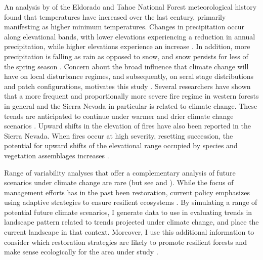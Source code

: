 An analysis by \citep{Mallek2014} of the Eldorado and Tahoe National Forest meteorological history found that temperatures have increased over the last century, primarily manifesting as higher minimum temperatures. Changes in precipitation occur along elevational bands, with lower elevations experiencing a reduction in annual precipitation, while higher elevations experience an increase \citep{Mallek2014}. In addition, more precipitation is falling as rain as opposed to snow, and snow persists for less of the spring season \citep{Mallek2014}. Concern about the broad influence that climate change will have on local disturbance regimes, and subsequently, on seral stage distributions and patch configurations, motivates this study \citep{Fule2008,North2012}. Several researchers have shown that a more frequent and proportionally more severe fire regime in western forests in general and the Sierra Nevada in particular \citep{McKenzie2004,Westerling2011,Miller2012} is related to climate change. These trends are anticipated to continue under warmer and drier climate change scenarios \citep{Dale2001,Cook2004,Westerling2006, Westerling2008}. Upward shifts in the elevation of fires have also been reported in the Sierra Nevada\citep{Schwartz2015}. When fires occur at high severity, resetting succession, the potential for upward shifts of the elevational range occupied by species and vegetation assemblages increases \citep{Schwartz2015}. 

Range of variability analyses that offer a complementary analysis of future scenarios under climate change are rare (but see \cite{Keane2008} and \cite{Duveneck2014}). While the focus of management efforts has in the past been restoration, current policy emphasizes using adaptive strategies to ensure resilient ecosystems \citep{Stephens2010}. By simulating a range of potential future climate scenarios, I generate data to use in evaluating trends in landscape pattern related to trends projected under climate change, and place the current landscape in that context. Moreover, I use this additional information to consider which restoration strategies are likely to promote resilient forests and make sense ecologically for the area under study \citep{Duncan2010}. 

